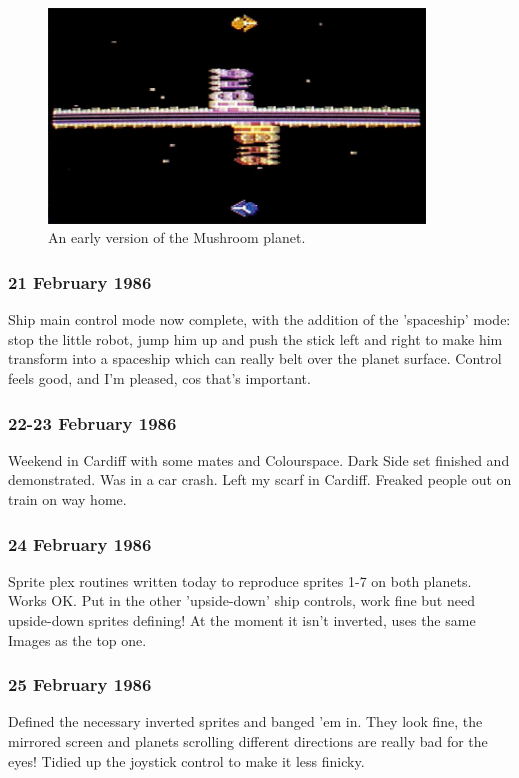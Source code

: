 \begin{figure}[H]
    \centering
      \includegraphics[width=10cm]{src/diary/zzap13_pic2.jpg}%
\caption{An early version of the Mushroom planet.}
\end{figure}

\subsubsection{21 February 1986}
Ship main control mode now complete, with the addition of the 'spaceship' mode: stop the little robot, jump him up and push the stick left and right to make him transform into a spaceship which can really belt over the planet surface. Control feels good, and I'm pleased, cos that's important.

\subsubsection{22-23 February 1986}
Weekend in Cardiff with some mates and Colourspace. Dark Side set finished and demonstrated. Was in a car crash. Left my scarf in Cardiff. Freaked people out on train on way home.

\subsubsection{24 February 1986}
Sprite plex routines written today to reproduce sprites 1-7 on both planets. Works OK. Put in the other 'upside-down' ship controls, work fine but need upside-down sprites defining! At the moment it isn't inverted, uses the same Images as the top one.

\subsubsection{25 February 1986}
Defined the necessary inverted sprites and banged 'em in. They look fine, the mirrored screen and planets scrolling different directions are really bad for the eyes! Tidied up the joystick control to make it less finicky.

